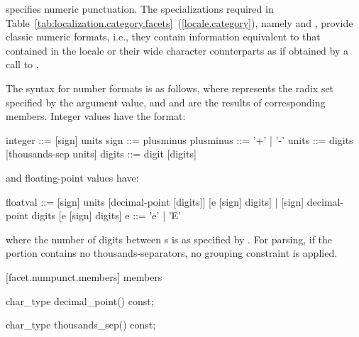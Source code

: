 \pnum
{}
specifies numeric punctuation.
The specializations required in Table~\ref{tab:localization.category.facets}~(\ref{locale.category}), namely
and
,
provide classic
numeric formats,
i.e., they contain information equivalent to that contained in the
locale or their wide character counterparts as if obtained by
a call to
.

\pnum
The syntax for number formats is as follows, where
represents the radix set specified by the
argument value, and
and
are the results of corresponding
members.
Integer values have the format:

\begin{codeblock}
integer   ::= [sign] units
sign      ::= plusminus
plusminus ::= '+' | '-'
units     ::= digits [thousands-sep units]
digits    ::= digit [digits]
\end{codeblock}

and floating-point values have:

\begin{codeblock}
floatval ::= [sign] units [decimal-point [digits]] [e [sign] digits] |
             [sign]        decimal-point  digits   [e [sign] digits]
e        ::= 'e' | 'E'
\end{codeblock}

where the number of digits between
s
is as specified by
.
For parsing, if the
portion contains no thousands-separators, no grouping constraint
is applied.

[facet.numpunct.members]{ members}

%
\begin{itemdecl}
char_type decimal_point() const;
\end{itemdecl}

\begin{itemdescr}
\pnum
\returns
{}
\end{itemdescr}

%
\begin{itemdecl}
char_type thousands_sep() const;
\end{itemdecl}

\begin{itemdescr}
\pnum
\returns
{}
\end{itemdescr}

